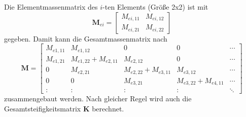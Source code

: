 \documentclass[a4paper,10pt,twoside]{article}
\numberwithin{equation}{section} %
\numberwithin{figure}{section}   %
\numberwithin{table}{section}    %
\begin{document}
	Die Elementmassenmatrix des $i$-ten Elements (Größe 2x2) ist mit
	\begin{equation}\label{equ:linear-Mei-matrix}
	\mathbf{M}_{ei} = \left[ 
	\begin{array}{cc}
	M_{ei,11} & M_{ei,12} \\
	M_{ei,21} & M_{ei,22}
	\end{array}
	\right] 
	\end{equation}
	gegeben. Damit kann die Gesamtmassenmatrix nach
	\begin{equation}\label{equ:linear-M-Matrix}
	\mathbf{M} = 
	\left[ 
	\begin{array}{ccccc}
	M_{e1,11} & M_{e1,12}           & 0                   & 0                   & \cdots \\
	M_{e1,21} & M_{e1,22}+M_{e2,11} & M_{e2,12}           & 0                   & \cdots \\
	0         & M_{e2,21}           & M_{e2,22}+M_{e3,11} & M_{e3,12}           & \cdots \\
	0         & 0                   & M_{e3,21}           & M_{e3,22}+M_{e4,11} & \cdots \\
	\colon    & \colon              & \colon              & \colon              & \ddots 
	\end{array}
	\right] 
	\end{equation}
	zusammengebaut werden. Nach gleicher Regel wird auch die Gesamtsteifigkeitsmatrix $ \mathbf{K} $ berechnet.
	
\end{document}
